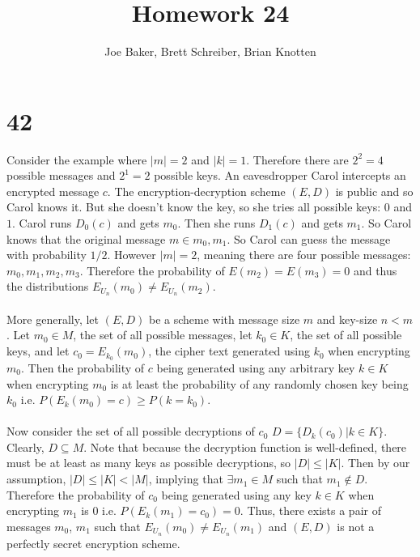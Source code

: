 \documentclass[letterpaper,notitlepage,twoside]{article}
\begin{document}
\title{Homework 24}
\author{Joe Baker, Brett Schreiber, Brian Knotten}
\maketitle

\section*{42}
Consider the example where $|m| = 2$ and $|k| = 1$. Therefore there are $2^2 = 4$ possible messages and $2^1 = 2$ possible keys. An eavesdropper Carol intercepts an encrypted message $c$. The encryption-decryption scheme $(E, D)$ is public and so Carol knows it. But she doesn't know the key, so she tries all possible keys: $0$ and $1$. Carol runs $D_0(c)$ and gets $m_0$. Then she runs $D_1(c)$ and gets $m_1$. So Carol knows that the original message $m \in {m_0, m_1}$. So Carol can guess the message with probability $1/2$. However $|m| = 2$, meaning there are four possible messages: $m_0, m_1, m_2, m_3$. Therefore the probability of $E(m_2) = E(m_3) = 0$ and thus the distributions $E_{U_{n}}(m_0) \neq E_{U_{n}}(m_2)$. \\\\
More generally, let $(E, D)$ be a scheme with message size $m$ and key-size $n < m$. Let $m_{0} \in M$, the set of all possible messages, let $k_0 \in K$, the set of all possible keys, and let $c_{0} = E_{k_0}(m_0)$, the cipher text generated using $k_0$ when encrypting $m_0$. Then the probability of $c$ being generated using any arbitrary key $k \in K$ when encrypting $m_0$ is at least the probability of any randomly chosen key being $k_0$ i.e. $P(E_k(m_0) = c) \geq P(k = k_0)$. \\\\
Now consider the set of all possible decryptions of $c_0$ $D=\{D_k(c_0) | k \in K\}$. Clearly, $D \subseteq M$. Note that because the decryption function is well-defined, there must be at least as many keys as possible decryptions, so $|D| \leq |K|$. Then by our assumption, $|D| \leq |K| < |M|$, implying that $\exists m_1 \in M$ such that $m_1 \notin D$. Therefore the probability of $c_0$ being generated using any key $k \in K$ when encrypting $m_1$ is 0 i.e. $P(E_k(m_1) = c_0) = 0$. Thus, there exists a pair of messages $m_0$, $m_1$ such that $E_{U_n}(m_0) \neq E_{U_n}(m_1)$ and $(E, D)$ is not a perfectly secret encryption scheme.
\end{document}
